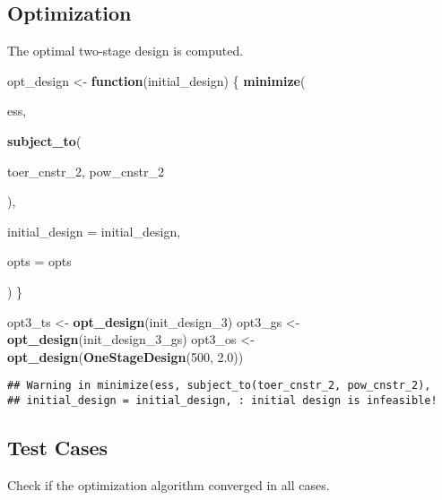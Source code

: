\documentclass[]{book}
\newenvironment{Shaded}{\begin{snugshade}}{\end{snugshade}}
\newcommand{\ControlFlowTok}[1]{\textcolor[rgb]{0.13,0.29,0.53}{\textbf{#1}}}
\newcommand{\DataTypeTok}[1]{\textcolor[rgb]{0.13,0.29,0.53}{#1}}
\newcommand{\DecValTok}[1]{\textcolor[rgb]{0.00,0.00,0.81}{#1}}
\newcommand{\FloatTok}[1]{\textcolor[rgb]{0.00,0.00,0.81}{#1}}
\newcommand{\KeywordTok}[1]{\textcolor[rgb]{0.13,0.29,0.53}{\textbf{#1}}}
\newcommand{\NormalTok}[1]{#1}
\newcommand{\OperatorTok}[1]{\textcolor[rgb]{0.81,0.36,0.00}{\textbf{#1}}}
\newcommand{\StringTok}[1]{\textcolor[rgb]{0.31,0.60,0.02}{#1}}
\begin{document}
\hypertarget{optimization-8}{%
\subsection{Optimization}\label{optimization-8}}

The optimal two-stage design is computed.

\begin{Shaded}
\begin{Highlighting}[]
\NormalTok{opt_design <-}\StringTok{ }\ControlFlowTok{function}\NormalTok{(initial_design) \{}
    \KeywordTok{minimize}\NormalTok{(}
        
\NormalTok{        ess,}
        
        \KeywordTok{subject_to}\NormalTok{(}
            
\NormalTok{            toer_cnstr_}\DecValTok{2}\NormalTok{,}
\NormalTok{            pow_cnstr_}\DecValTok{2}
            
\NormalTok{        ),}
        
        \DataTypeTok{initial_design =}\NormalTok{ initial_design,}
        
        \DataTypeTok{opts =}\NormalTok{ opts}
        
\NormalTok{)}
\NormalTok{\}}

\NormalTok{opt3_ts <-}\StringTok{ }\KeywordTok{opt_design}\NormalTok{(init_design_}\DecValTok{3}\NormalTok{)}
\NormalTok{opt3_gs <-}\StringTok{ }\KeywordTok{opt_design}\NormalTok{(init_design_}\DecValTok{3}\NormalTok{_gs)}
\NormalTok{opt3_os <-}\StringTok{ }\KeywordTok{opt_design}\NormalTok{(}\KeywordTok{OneStageDesign}\NormalTok{(}\DecValTok{500}\NormalTok{, }\FloatTok{2.0}\NormalTok{))}
\end{Highlighting}
\end{Shaded}

\begin{verbatim}
## Warning in minimize(ess, subject_to(toer_cnstr_2, pow_cnstr_2),
## initial_design = initial_design, : initial design is infeasible!
\end{verbatim}

\hypertarget{test-cases-9}{%
\subsection{Test Cases}\label{test-cases-9}}

Check if the optimization algorithm converged in all cases.

\begin{Shaded}
\end{Shaded}
\end{document}
